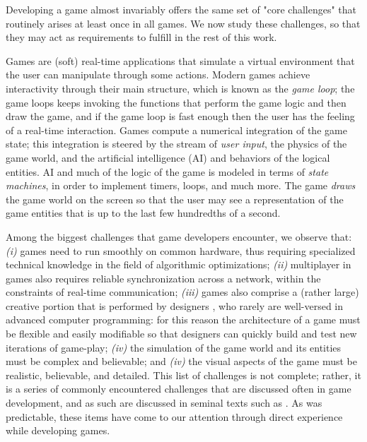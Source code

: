 Developing a game almost invariably offers the same set of "core challenges" that routinely arises at least once in all games. We now study these challenges, so that they may act as requirements to fulfill in the rest of this work.

Games are (soft) real-time applications that simulate a virtual environment that the user can manipulate through some actions. Modern games achieve interactivity through their main structure, which is known as the \textit{game loop}; the game loops keeps invoking the functions that perform the game logic and then draw the game, and if the game loop is fast enough then the user has the feeling of a real-time interaction. Games compute a numerical integration of the game state; this integration is steered by the stream of \textit{user input}, the physics of the game world, and the artificial intelligence (AI) and behaviors of the logical entities. AI and much of the logic of the game is modeled in terms of \textit{state machines}, in order to implement timers, loops, and much more. The game \textit{draws} the game world on the screen so that the user may see a representation of the game entities that is up to the last few hundredths of a second. 

Among the biggest challenges that game developers encounter, we observe that: \textit{(i)} games need to run smoothly on common hardware, thus requiring specialized technical knowledge in the field of algorithmic optimizations; \textit{(ii)} multiplayer in games also requires reliable synchronization across a network, within the constraints of real-time communication; \textit{(iii)} games also comprise a (rather large) creative portion that is performed by designers \cite{CHAPTER_1_DESIGNERS_TOUCH_THE_GAME}, who rarely are well-versed in advanced computer programming: for this reason the architecture of a game must be flexible and easily modifiable so that designers can quickly build and test new iterations of game-play; \textit{(iv)} the simulation of the game world and its entities must be complex and believable; and \textit{(iv)} the visual aspects of the game must be realistic, believable, and detailed. This list of challenges is not complete; rather, it is a series of commonly encountered challenges that are discussed often in game development, and as such are discussed in seminal texts such as \cite{APPENDIX_D_HANDMADE_OPTIMIZATION_IN_GAMES, CHAPTER_1_GAME_ENGINES, APPENDIX_B_NETWORKING_DIFFICULTIES}. As was predictable, these items have come to our attention through direct experience while developing games.

